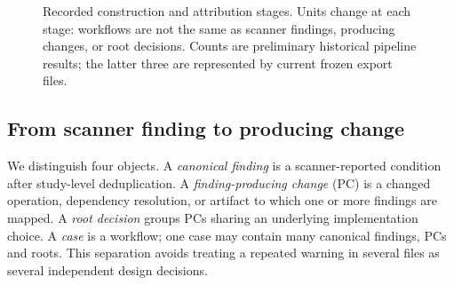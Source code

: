 \documentclass[journal,10pt,twoside]{IEEEtran}
\begin{document}
\begin{figure}[t]
\centering
{}
\caption{Recorded construction and attribution stages. Units change at each stage: workflows are not the same as scanner findings, producing changes, or root decisions. Counts are preliminary historical pipeline results; the latter three are represented by current frozen export files.}
\label{fig:pipeline}
\end{figure}

\subsection{From scanner finding to producing change}
We distinguish four objects. A \emph{canonical finding} is a scanner-reported condition after study-level deduplication. A \emph{finding-producing change} (PC) is a changed operation, dependency resolution, or artifact to which one or more findings are mapped. A \emph{root decision} groups PCs sharing an underlying implementation choice. A \emph{case} is a workflow; one case may contain many canonical findings, PCs and roots. This separation avoids treating a repeated warning in several files as several independent design decisions.
\end{document}

